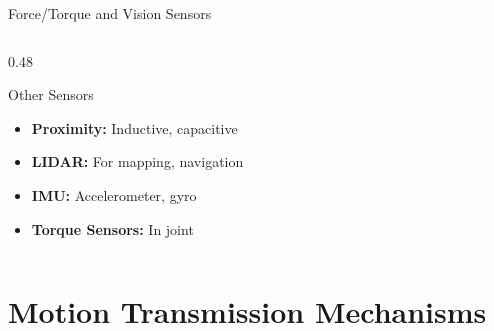 \documentclass[10pt]{beamer}
\begin{document}
\begin{frame}{Force/Torque and Vision Sensors}
\begin{columns}
\begin{column}{0.48\textwidth}
			\begin{block}{Other Sensors}
				\begin{itemize}
					\footnotesize
					\item \textbf{Proximity:} Inductive, capacitive
					\item \textbf{LIDAR:} For mapping, navigation
					\item \textbf{IMU:} Accelerometer, gyro
					\item \textbf{Torque Sensors:} In joint
				\end{itemize}
			\end{block}
		\end{column}
	\end{columns}
\end{frame}

\section{Motion Transmission Mechanisms}
\end{document}
